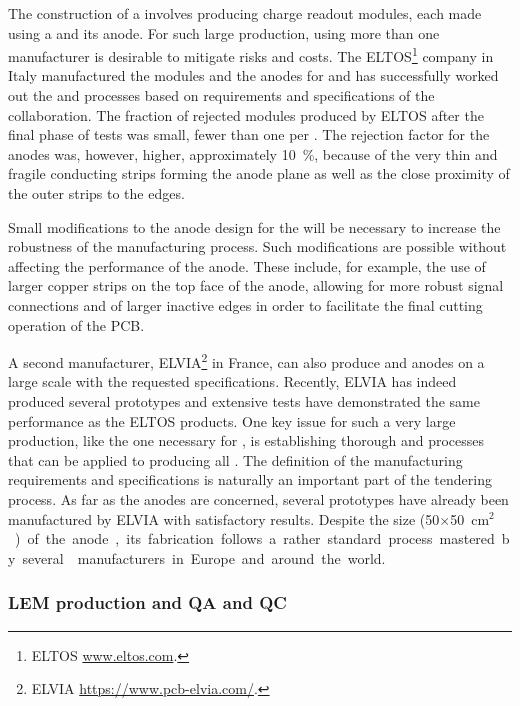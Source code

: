 The construction of a  
 involves producing \dpnumswch charge readout modules, each made using a  and its anode. For such large production, using more than one manufacturer is desirable to mitigate risks and costs. The ELTOS\footnote{ELTOS\texttrademark{} \url{www.eltos.com}.} company in Italy manufactured the  modules and the anodes for   and has successfully worked out the  and  processes based on requirements and specifications of the  collaboration. The fraction of rejected  modules produced by ELTOS after the final phase of tests was small, fewer than one  per . The rejection factor for the anodes was, however, higher, approximately \SI{10}{\%}, because of the very thin and fragile conducting strips forming the anode plane as well as the close proximity of the outer strips to the  edges. 

Small modifications to the anode design for the  will be necessary to increase the robustness of the manufacturing process. Such modifications are possible without  
affecting the performance of the anode. These include, for example, the use of larger copper strips on the top face of the anode, allowing for more robust signal connections and of larger inactive edges in order to facilitate the final cutting operation of the PCB.    

A second manufacturer, ELVIA\footnote{ELVIA\texttrademark{} \url{https://www.pcb-elvia.com/}.} in France, can also produce  and anodes on a large scale with the requested specifications. Recently, ELVIA has indeed produced several  prototypes and extensive tests have 
demonstrated the same  performance as the ELTOS products.
 One key issue for such a very large production, like the one necessary for , is establishing thorough  and  processes that can be applied to producing all . The definition of the  manufacturing requirements and specifications is naturally an important part of the tendering process. As far as the anodes are concerned, several prototypes have already been manufactured by ELVIA with satisfactory results. Despite the size (\num{50}$\times$\SI{50}{cm$^2$}) of the anode, its fabrication follows a rather standard process mastered by several  manufacturers in Europe and around the world.     

\subsubsection{LEM production and QA and QC}
\label{sec:fddp-crp-LEMprod}

